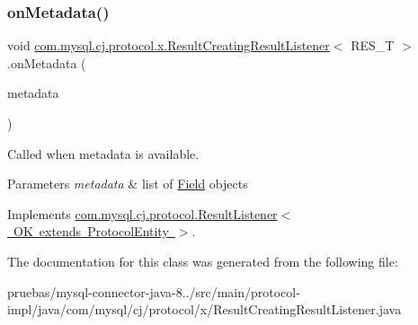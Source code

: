 \mbox{\label{classcom_1_1mysql_1_1cj_1_1protocol_1_1x_1_1_result_creating_result_listener_a453e531bc60f8e74d1f19ae2ddd2fd37}} 
\subsubsection{\texorpdfstring{on\+Metadata()}{onMetadata()}}
{\footnotesize\ttfamily void \mbox{\hyperlink{classcom_1_1mysql_1_1cj_1_1protocol_1_1x_1_1_result_creating_result_listener}{com.\+mysql.\+cj.\+protocol.\+x.\+Result\+Creating\+Result\+Listener}}$<$ R\+E\+S\+\_\+T $>$.on\+Metadata (\begin{DoxyParamCaption}\item[{\mbox{\hyperlink{interfacecom_1_1mysql_1_1cj_1_1protocol_1_1_column_definition}{Column\+Definition}}}]{metadata }\end{DoxyParamCaption})}

Called when metadata is available.


\begin{DoxyParams}{Parameters}
{\em metadata} & list of \mbox{\hyperlink{}{Field}} objects \\
\hline
\end{DoxyParams}


Implements \mbox{\hyperlink{interfacecom_1_1mysql_1_1cj_1_1protocol_1_1_result_listener_a7252b90a18c4d3dc585cb7ded00b06f9}{com.\+mysql.\+cj.\+protocol.\+Result\+Listener$<$ O\+K extends Protocol\+Entity $>$}}.



The documentation for this class was generated from the following file\+:\begin{DoxyCompactItemize}
\item 
pruebas/mysql-\/connector-\/java-\/8../src/main/protocol-\/impl/java/com/mysql/cj/protocol/x/Result\+Creating\+Result\+Listener.\+java\end{DoxyCompactItemize}
